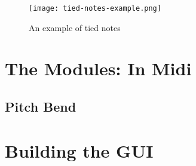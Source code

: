 \begin{figure}
  \centering
  \texttt{[image: tied-notes-example.png]}
  \caption{An example of tied notes}
  \label{fig:tied-notes-example}
\end{figure}


\section{The Modules: In Midi}\label{section:the-modules-midi}

\subsection{Pitch Bend}

\section{Building the GUI}\label{section:building-the-gui}